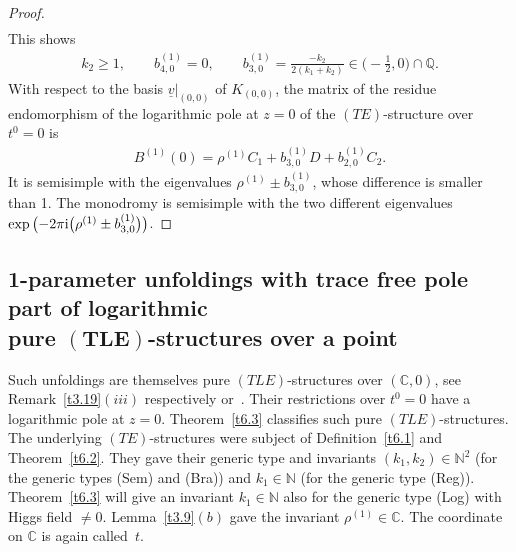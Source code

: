 \documentclass[10pt,a4paper]{amsart}
\numberwithin{equation}{section}
\numberwithin{figure}{section}
\newcommand{\N}{{\mathbb N}}
\newcommand{\Q}{{\mathbb Q}}
\newcommand{\C}{{\mathbb C}}
\newcommand{\uuuu}{\underline}
\begin{document}
\begin{proof}
\begin{align*}
\end{align*}
This shows
\begin{gather*}%
k_2\geq 1,\qquad b_{4,0}^{(1)}=0,\qquad
b_{3,0}^{(1)}=\frac{-k_2}{2(k_1+k_2)}
\in \bigg({-}\frac{1}{2},0\bigg)\cap\Q.
\end{gather*}
With respect to the basis $\uuuu{v}|_{(0,0)}$ of $K_{(0,0)}$,
the matrix of the residue endomorphism of the
logarithmic pole at $z=0$ of the $(TE)$-structure over $t^0=0$
is
\begin{gather*}
B^{(1)}(0)= \rho^{(1)}C_1 + b_{3,0}^{(1)}D+b_{2,0}^{(1)}C_2.
\end{gather*}
It is semisimple with the eigenvalues
$\rho^{(1)}\pm b_{3,0}^{(1)}$, whose difference is smaller
than 1. The mono\-dromy is semisimple with the two different
eigenvalues $\exp\big({-}2\pi {\rm i}\big(\rho^{(1)}\pm b_{3,0}^{(1)}\big)\big)$.
\end{proof}


\subsection[1-parameter unfoldings with trace free pole part
of logarithmic pure $(TLE)$-structures over a point]
{1-parameter unfoldings with trace free pole part
of logarithmic \\pure $\boldsymbol{(TLE)}$-structures over a point}\label{c6.2}

Such unfoldings are themselves pure $(TLE)$-structures
over $(\C,0)$, see Remark~\ref{t3.19}$(iii)$ respectively
\cite[Chapter~VI, Theorem~2.1]{Sa02} or~\cite[Theorem~5.1(c)]{DH20-2}.
Their restrictions over $t^0=0$ have a logarithmic
pole at $z=0$.
Theorem~\ref{t6.3} classifies such pure $(TLE)$-structures.
The underlying $(TE)$-structures were subject of
Definition~\ref{t6.1} and Theorem~\ref{t6.2}.
They gave their generic type and
invariants $(k_1,k_2)\in\N^2$ (for the generic types
(Sem) and (Bra)) and $k_1\in\N$ (for the generic type (Reg)).
Theorem~\ref{t6.3} will give an invariant $k_1\in\N$ also
for the generic type (Log) with Higgs field $\neq 0$.
Lemma~\ref{t3.9}$(b)$ gave the invariant $\rho^{(1)}\in\C$.
The coordinate on $\C$ is again called~$t$.
\end{document}
